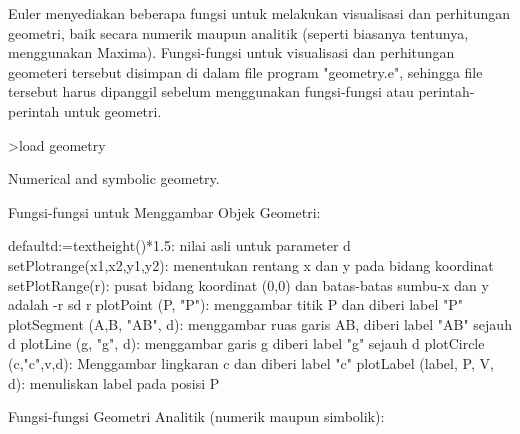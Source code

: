 \documentclass[a4paper,10pt]{article}
\begin{document}
\begin{eulernotebook}
\begin{eulercomment}
\begin{eulercomment}
\begin{eulercomment}
\begin{eulercomment}
\begin{eulercomment}
\begin{eulercomment}
\begin{eulercomment}
\begin{eulercomment}
\begin{eulercomment}
\begin{eulercomment}
\begin{eulercomment}
\begin{eulercomment}
\begin{eulercomment}
\begin{eulercomment}
\begin{eulercomment}
\begin{eulercomment}
\begin{eulercomment}
\begin{eulercomment}
\begin{eulercomment}
\begin{eulercomment}
\begin{eulercomment}
\begin{eulercomment}
\begin{eulercomment}
\begin{eulercomment}
\begin{eulercomment}
\begin{eulercomment}
\begin{eulercomment}
\begin{eulercomment}
\begin{eulercomment}
\begin{eulercomment}
\begin{euleroutput}
\end{euleroutput}
\begin{eulercomment}
Euler menyediakan beberapa fungsi untuk melakukan visualisasi dan perhitungan geometri, baik
secara numerik maupun analitik (seperti biasanya tentunya, menggunakan Maxima).
Fungsi-fungsi untuk visualisasi dan perhitungan geometeri tersebut disimpan di dalam file
program "geometry.e", sehingga file tersebut harus dipanggil sebelum menggunakan
fungsi-fungsi atau perintah-perintah untuk geometri.
\end{eulercomment}
\begin{eulerprompt}
>load geometry
\end{eulerprompt}
\begin{euleroutput}
  Numerical and symbolic geometry.
\end{euleroutput}
\begin{eulercomment}
Fungsi-fungsi untuk Menggambar Objek Geometri:

\end{eulercomment}
\begin{eulerttcomment}
  defaultd:=textheight()*1.5: nilai asli untuk parameter d
  setPlotrange(x1,x2,y1,y2): menentukan rentang x dan y pada bidang koordinat
  setPlotRange(r): pusat bidang koordinat (0,0) dan batas-batas sumbu-x dan y adalah -r sd r
  plotPoint (P, "P"): menggambar titik P dan diberi label "P"
  plotSegment (A,B, "AB", d): menggambar ruas garis AB, diberi label "AB" sejauh d
  plotLine (g, "g", d): menggambar garis g diberi label "g" sejauh d
  plotCircle (c,"c",v,d): Menggambar lingkaran c dan diberi label "c"
  plotLabel (label, P, V, d): menuliskan label pada posisi P
\end{eulerttcomment}
\begin{eulercomment}

Fungsi-fungsi Geometri Analitik (numerik maupun simbolik):


\end{eulercomment}
\end{eulercomment}
\end{eulercomment}
\end{eulercomment}
\end{eulercomment}
\end{eulercomment}
\end{eulercomment}
\end{eulercomment}
\end{eulercomment}
\end{eulercomment}
\end{eulercomment}
\end{eulercomment}
\end{eulercomment}
\end{eulercomment}
\end{eulercomment}
\end{eulercomment}
\end{eulercomment}
\end{eulercomment}
\end{eulercomment}
\end{eulercomment}
\end{eulercomment}
\end{eulercomment}
\end{eulercomment}
\end{eulercomment}
\end{eulercomment}
\end{eulercomment}
\end{eulercomment}
\end{eulercomment}
\end{eulercomment}
\end{eulercomment}
\end{eulercomment}
\end{eulernotebook}
\end{document}

